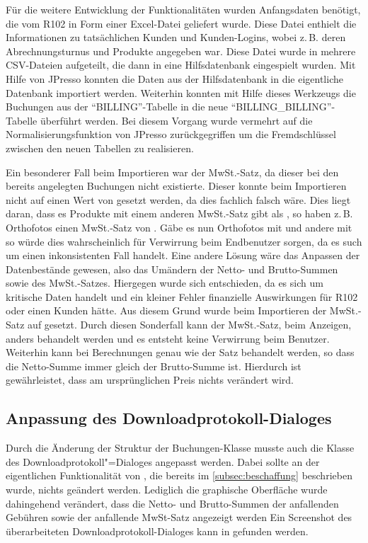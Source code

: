 Für die weitere Entwicklung der Funktionalitäten wurden Anfangsdaten benötigt, die vom R102 in Form einer Excel-Datei geliefert wurde.
Diese Datei enthielt die Informationen zu tatsächlichen Kunden und Kunden-Logins, wobei z.\,B. deren Abrechnungsturnus und Produkte angegeben war.
Diese Datei wurde in mehrere \acs{CSV}-Dateien aufgeteilt, die dann in eine Hilfsdatenbank eingespielt wurden.
Mit Hilfe von JPresso konnten die Daten aus der Hilfsdatenbank in die eigentliche Datenbank importiert werden.
Weiterhin konnten mit Hilfe dieses Werkzeugs die Buchungen aus der "`BILLING"'-Tabelle in die neue "`BILLING\_BILLING"'-Tabelle überführt werden.
Bei diesem Vorgang wurde vermehrt auf die Normalisierungsfunktion von JPresso zurückgegriffen um die Fremdschlüssel zwischen den neuen Tabellen zu realisieren.

Ein besonderer Fall beim Importieren war der MwSt.-Satz, da dieser bei den bereits angelegten Buchungen nicht existierte.
Dieser konnte beim Importieren nicht auf einen Wert von  gesetzt werden, da dies fachlich falsch wäre.
Dies liegt daran, dass es Produkte mit einem anderen MwSt.-Satz gibt als , so haben z.\,B. Orthofotos einen MwSt.-Satz von .
Gäbe es nun Orthofotos mit  und andere mit  so würde dies wahrscheinlich für Verwirrung beim Endbenutzer sorgen, da es such um einen inkonsistenten Fall handelt.
Eine andere Lösung wäre das Anpassen der Datenbestände gewesen, also das Umändern der Netto- und Brutto-Summen sowie des MwSt.-Satzes. 
Hiergegen wurde sich entschieden, da es sich um kritische Daten handelt und ein kleiner Fehler finanzielle Auswirkungen für R102 oder einen Kunden hätte.
Aus diesem Grund wurde beim Importieren der MwSt.-Satz auf  gesetzt.
Durch diesen Sonderfall kann der MwSt.-Satz, beim Anzeigen, anders behandelt werden und es entsteht keine Verwirrung beim Benutzer.
Weiterhin kann bei Berechnungen  genau wie der Satz  behandelt werden, so dass die Netto-Summe immer gleich der Brutto-Summe ist.
Hierdurch ist gewährleistet, dass am ursprünglichen Preis nichts verändert wird.


\subsection{Anpassung des Downloadprotokoll-Dialoges}
Durch die Änderung der Struktur der Buchungen-Klasse musste auch die Klasse des Downloadprotokoll"=Dialoges  angepasst werden.
Dabei sollte an der eigentlichen Funktionalität von , die bereits im \autoref{subsec:beschaffung} beschrieben wurde, nichts geändert werden.
Lediglich die graphische Oberfläche wurde dahingehend verändert, dass die Netto- und Brutto-Summen der anfallenden Gebühren sowie der anfallende MwSt-Satz angezeigt werden
Ein Screenshot des überarbeiteten Downloadprotokoll-Dialoges kann in  gefunden werden.

